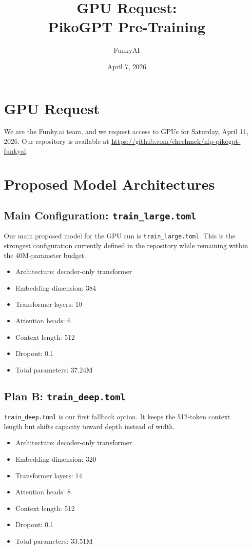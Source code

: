 \documentclass[11pt]{article}
\title{GPU Request:\\PikoGPT Pre-Training}
\author{FunkyAI}
\date{April 7, 2026}
\begin{document}
\maketitle

\section*{GPU Request}
We are the Funky.ai team, and we request access to GPUs for Saturday, April 11, 2026.
Our repository is available at \href{https://github.com/chechmek/nlp-pikogpt-funkyai}{https://github.com/chechmek/nlp-pikogpt-funkyai}.

\section*{Proposed Model Architectures}

\subsection*{Main Configuration: \texttt{train\_large.toml}}
Our main proposed model for the GPU run is \texttt{train\_large.toml}. This is the strongest configuration currently defined in the repository while remaining within the 40M-parameter budget.

\begin{itemize}[leftmargin=1.5em]
  \item Architecture: decoder-only transformer
  \item Embedding dimension: 384
  \item Transformer layers: 10
  \item Attention heads: 6
  \item Context length: 512
  \item Dropout: 0.1
  \item Total parameters: 37.24M
\end{itemize}

\subsection*{Plan B: \texttt{train\_deep.toml}}
\texttt{train\_deep.toml} is our first fallback option. It keeps the 512-token context length but shifts capacity toward depth instead of width.

\begin{itemize}[leftmargin=1.5em]
  \item Architecture: decoder-only transformer
  \item Embedding dimension: 320
  \item Transformer layers: 14
  \item Attention heads: 8
  \item Context length: 512
  \item Dropout: 0.1
  \item Total parameters: 33.51M
\end{itemize}
\end{document}
